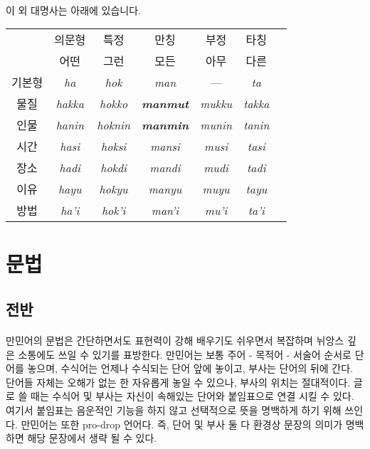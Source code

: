 \documentclass{book}
\begin{document}
    \paragraph{}
    이 외 대명사는 아래에 있습니다. 
    \footnotesize
    \begin{center}
        \begin{tabular}{|c|c|c|c|c|c|c|}\hline
             &의문형 & 특정 & 만칭 & 부정 & 타칭 \\ \cline{2-6}
             &어떤& 그런 & 모든 & 아무 & 다른 \\ \hline
            기본형 & \textit{ha} & \textit{hok} & \textit{man} & --- & \textit{ta} \\ \hline
            물질 & \textit{hakka} & \textit{hokko} & \textbf{\textit{manmut}} & \textit{mukku} & \textit{takka} \\ \hline
             인물 & \textit{hanin} & \textit{hoknin} & \textbf{\textit{manmin}} & \textit{munin} & \textit{tanin} \\ \hline
             시간& \textit{hasi} & \textit{hoksi} & \textit{mansi} & \textit{musi} & \textit{tasi} \\ \hline
             장소& \textit{hadi} & \textit{hokdi} & \textit{mandi} & \textit{mudi} & \textit{tadi} \\ \hline
             이유& \textit{hayu} & \textit{hokyu} & \textit{manyu} & \textit{muyu} & \textit{tayu} \\ \hline
             방법& \textit{ha'i} & \textit{hok'i} & \textit{man'i} & \textit{mu'i} & \textit{ta'i} \\ \hline
        \end{tabular}
    \end{center}
    \normalsize\vfill\newpage
    \section{문법} 
        \subsection{전반}
        \paragraph{}만민어의 문법은 간단하면서도 표현력이 강해 배우기도 쉬우면서 복잡하며 뉘앙스 깊은 소통에도 쓰일 수 있기를 표방한다.  만민어는 보통 주어 - 목적어 - 서술어 순서로 단어를 놓으며, 수식어는 언제나 수식되는 단어 앞에 놓이고, 부사는 단어의 뒤에 간다.  단어들 자체는 오해가 없는 한 자유롭게 놓일 수 있으나, 부사의 위치는 절대적이다.  글로 쓸 때는 수식어 및 부사는 자신이 속해있는 단어와 붙임표으로 연결 시킬 수 있다. 여기서 붙임표는 음운적인 기능을 하지 않고 선택적으로 뜻을 명백하게 하기 위해 쓰인다.  만민어는 또한 pro-drop 언어다. 즉, 단어 및 부사 둘 다 환경상 문장의 의미가 명백하면 해당 문장에서 생략 될 수 있다.
\end{document}
